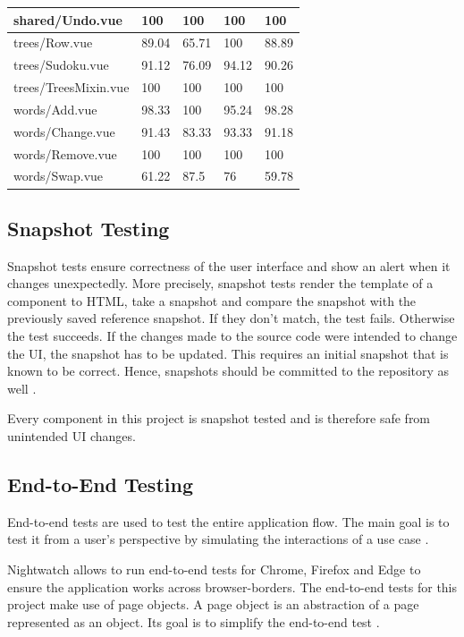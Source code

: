 \begin{table}
\begin{adjustwidth}{-2cm}{}
\begin{tabular}{|l|l|l|l|l|}
            shared/Undo.vue & 100 & 100 & 100 & 100 \\ \hline
            trees/Row.vue & 89.04 & 65.71 & 100 & 88.89 \\ \hline
            trees/Sudoku.vue & 91.12 & 76.09 & 94.12 & 90.26 \\ \hline
            trees/TreesMixin.vue & 100 & 100 & 100 & 100 \\ \hline
            words/Add.vue & 98.33 & 100 & 95.24 & 98.28 \\ \hline
            words/Change.vue & 91.43 & 83.33 & 93.33 & 91.18 \\ \hline
            words/Remove.vue & 100 & 100 & 100 & 100 \\ \hline
            words/Swap.vue & 61.22 & 87.5 & 76 & 59.78 \\ \hline
        \end{tabular}
        \label{table:testCoverage}
    \end{adjustwidth}
\end{table}

\subsection{Snapshot Testing}
\label{subsection:snapshotTesting}
Snapshot tests ensure correctness of the user interface and show an alert when it changes unexpectedly. More precisely, snapshot tests render the template of a component to HTML, take a snapshot and compare the snapshot with the previously saved reference snapshot. If they don't match, the test fails. Otherwise the test succeeds. If the changes made to the source code were intended to change the UI, the snapshot has to be updated. This requires an initial snapshot that is known to be correct. Hence, snapshots should be committed to the repository as well \cite{Jest}.

Every component in this project is snapshot tested and is therefore safe from unintended UI changes.

\subsection{End-to-End Testing}
\label{subsection:e2e}
End-to-end tests are used to test the entire application flow. The main goal is to test it from a user's perspective by simulating the interactions of a use case \cite{EndToEndTests}. 

Nightwatch allows to run end-to-end tests for Chrome, Firefox and Edge to ensure the application works across browser-borders. The end-to-end tests for this project make use of page objects. A page object is an abstraction of a page represented as an object. Its goal is to simplify the end-to-end test \cite{Nightwatch}.

